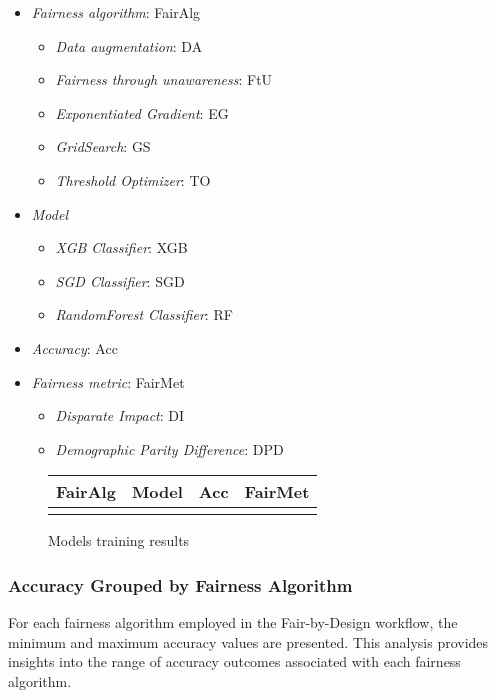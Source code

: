 \begin{itemize}
    \item \emph{Fairness algorithm}: FairAlg
    \begin{itemize}
        \item \emph{Data augmentation}: DA
        \item \emph{Fairness through unawareness}: FtU
        \item \emph{Exponentiated Gradient}: EG
        \item \emph{GridSearch}: GS
        \item \emph{Threshold Optimizer}: TO
    \end{itemize}
    \item \emph{Model}
    \begin{itemize}
        \item \emph{XGB Classifier}: XGB
        \item \emph{SGD Classifier}: SGD
        \item \emph{RandomForest Classifier}: RF
    \end{itemize}
    \item \emph{Accuracy}: Acc
    \item \emph{Fairness metric}: FairMet
    \begin{itemize}
        \item \emph{Disparate Impact}: DI
        \item \emph{Demographic Parity Difference}: DPD
    \end{itemize}
\end{itemize}

\begin{figure}[H]
    \centering
    \begin{tabular}{|c|c|c|c|}
        \hline
        \textbf{FairAlg} & \textbf{Model} & \textbf{Acc} & \textbf{FairMet} \\
        \hline
        & & & \\
        \hline
    \end{tabular}
    \caption{Models training results}
    \label{fig:results}
\end{figure}

\subsubsection{Accuracy Grouped by Fairness Algorithm}

For each fairness algorithm employed in the Fair-by-Design workflow, the minimum and maximum accuracy values are presented. This analysis provides insights into the range of accuracy outcomes associated with each fairness algorithm.

